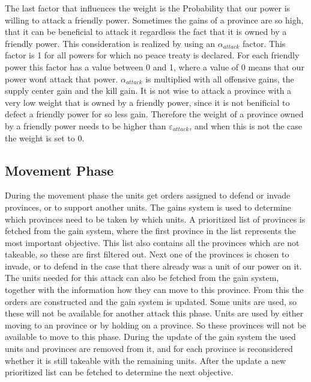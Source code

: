 \documentclass[a4paper]{article} %
\begin{document}
The last factor that influences the weight is the Probability that our power is willing to attack a friendly power. Sometimes the gains of a province are so high, that it can be beneficial to attack it regardless the fact that it is owned by a friendly power. This consideration is realized by using an $\alpha_{attack}$ factor. This factor is 1 for all powers for which no peace treaty is declared. For each friendly power this factor has a value between 0 and 1, where a value of 0 means that our power won\'t attack that power. $\alpha_{attack}$ is multiplied with all offensive gains, the supply center gain and the kill gain. It is not wise to attack a province with a very low weight that is owned by a friendly power, since it is not benificial to defect a friendly power for so less gain. Therefore the weight of a province owned by a friendly power needs to be higher than $\varepsilon_{attack}$, and when this is not the case the weight is set to 0. 

\subsection{Movement Phase} 

During the movement phase the units get orders assigned to defend or invade provinces, or to support another units. The gains system is used to determine which provinces need to be taken by which units. A prioritized list of provinces is fetched from the gain system, where the first province in the list represents the most important objective. This list also contains all the provinces which are not takeable, so these are first filtered out. Next one of the provinces is chosen to invade, or to defend in the case that there already was a unit of our power on it. The units needed for this attack can also be fetched from the gain system, together with the information how they can move to this province. From this the orders are constructed and the gain system is updated. Some units are used, so these will not be available for another attack this phase. Units are used by either moving to an province or by holding on a province. So these provinces will not be available to move to this phase. During the update of the gain system the used units and provinces are removed from it, and for each province is reconsidered whether it is still takeable with the remaining units. After the update a new prioritized list can be fetched to determine the next objective. 
\end{document}
